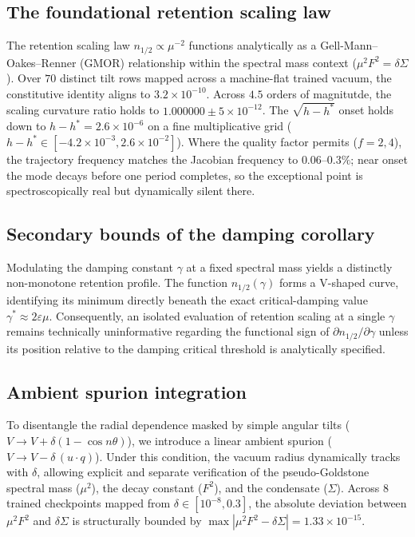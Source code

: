 \documentclass{article}
\begin{document}
\subsection{The foundational retention scaling law} The retention scaling law $n_{1/2}\propto\mu^{-2}$ functions analytically as a Gell-Mann--Oakes--Renner (GMOR) relationship within the spectral mass context ($\mu^2F^2=\delta\Sigma$). Over $70$ distinct tilt rows mapped across a machine-flat trained vacuum, the constitutive identity aligns to $3.2{\times}10^{-10}$. Across $4.5$ orders of magnitutde, the scaling curvature ratio holds to $1.000000\pm5{\times}10^{-12}$. The $\sqrt{h-h^*}$ onset holds down to $h-h^*=2.6{\times}10^{-6}$ on a fine multiplicative grid ($h-h^*\in[-4.2{\times}10^{-3},2.6{\times}10^{-2}]$). Where the quality factor permits ($f=2,4$), the trajectory frequency matches the Jacobian frequency to $0.06$--$0.3\%$; near onset the mode decays before one period completes, so the exceptional point is spectroscopically real but dynamically silent there.

\subsection{Secondary bounds of the damping corollary} Modulating the damping constant $\gamma$ at a fixed spectral mass yields a distinctly non-monotone retention profile. The function $n_{1/2}(\gamma)$ forms a V-shaped curve, identifying its minimum directly beneath the exact critical-damping value $\gamma^*\approx2\varepsilon\mu$. Consequently, an isolated evaluation of retention scaling at a single $\gamma$ remains technically uninformative regarding the functional sign of $\partial n_{1/2}/\partial\gamma$ unless its position relative to the damping critical threshold is analytically specified.

\subsection{Ambient spurion integration} To disentangle the radial dependence masked by simple angular tilts ($V\to V+\delta(1-\cos n\theta)$), we introduce a linear ambient spurion ($V\to V-\delta\,(u\cdot q)$). Under this condition, the vacuum radius dynamically tracks with $\delta$, allowing explicit and separate verification of the pseudo-Goldstone spectral mass ($\mu^2$), the decay constant ($F^2$), and the condensate ($\Sigma$). Across $8$ trained checkpoints mapped from $\delta\in[10^{-8},0.3]$, the absolute deviation between $\mu^2F^2$ and $\delta\Sigma$ is structurally bounded by $\max|\mu^2F^2-\delta\Sigma|=1.33{\times}10^{-15}$.
\end{document}
